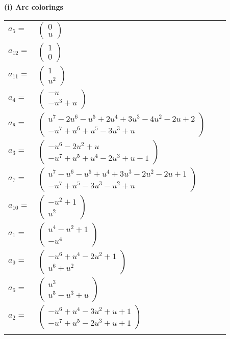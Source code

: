 \documentclass[1p]{elsarticle_modified}
\theoremstyle{definition}
\begin{document}
\flushleft \textbf{(i) Arc colorings}\\
\begin{tabular}{m{7pt} m{180pt} m{7pt} m{180pt} }
\flushright $a_{5}=$&$\begin{pmatrix}0\\u\end{pmatrix}$ \\
\flushright $a_{12}=$&$\begin{pmatrix}1\\0\end{pmatrix}$ \\
\flushright $a_{11}=$&$\begin{pmatrix}1\\u^2\end{pmatrix}$ \\
\flushright $a_{4}=$&$\begin{pmatrix}- u\\- u^3+u\end{pmatrix}$ \\
\flushright $a_{8}=$&$\begin{pmatrix}u^7-2 u^6- u^5+2 u^4+3 u^3-4 u^2-2 u+2\\- u^7+u^6+u^5-3 u^3+u\end{pmatrix}$ \\
\flushright $a_{3}=$&$\begin{pmatrix}- u^6-2 u^2+u\\- u^7+u^5+u^4-2 u^3+u+1\end{pmatrix}$ \\
\flushright $a_{7}=$&$\begin{pmatrix}u^7- u^6- u^5+u^4+3 u^3-2 u^2-2 u+1\\- u^7+u^5-3 u^3- u^2+u\end{pmatrix}$ \\
\flushright $a_{10}=$&$\begin{pmatrix}- u^2+1\\u^2\end{pmatrix}$ \\
\flushright $a_{1}=$&$\begin{pmatrix}u^4- u^2+1\\- u^4\end{pmatrix}$ \\
\flushright $a_{9}=$&$\begin{pmatrix}- u^6+u^4-2 u^2+1\\u^6+u^2\end{pmatrix}$ \\
\flushright $a_{6}=$&$\begin{pmatrix}u^3\\u^5- u^3+u\end{pmatrix}$ \\
\flushright $a_{2}=$&$\begin{pmatrix}- u^6+u^4-3 u^2+u+1\\- u^7+u^5-2 u^3+u+1\end{pmatrix}$\\&\end{tabular}
\end{document}
